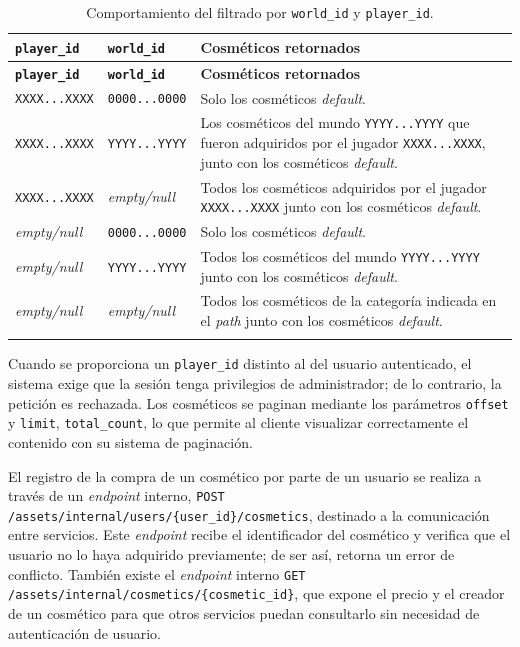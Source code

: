 \renewcommand{\arraystretch}{1.4}
\begin{longtable}{|l|l|p{7cm}|}
\hline
\textbf{\texttt{player\_id}} & \textbf{\texttt{world\_id}} & \textbf{Cosméticos retornados} \\
\hline
\endfirsthead
\hline
\textbf{\texttt{player\_id}} & \textbf{\texttt{world\_id}} & \textbf{Cosméticos retornados} \\
\hline
\endhead
\endfoot

\texttt{XXXX...XXXX} & \texttt{0000...0000} & Solo los cosméticos \textit{default}. \\
\hline
\texttt{XXXX...XXXX} & \texttt{YYYY...YYYY} & Los cosméticos del mundo \texttt{YYYY...YYYY} que fueron adquiridos por el jugador \texttt{XXXX...XXXX}, junto con los cosméticos \textit{default}. \\
\hline
\texttt{XXXX...XXXX} & \textit{empty/null}  & Todos los cosméticos adquiridos por el jugador \texttt{XXXX...XXXX} junto con los cosméticos \textit{default}. \\
\hline
\textit{empty/null}  & \texttt{0000...0000} & Solo los cosméticos \textit{default}. \\
\hline
\textit{empty/null}  & \texttt{YYYY...YYYY} & Todos los cosméticos del mundo \texttt{YYYY...YYYY} junto con los cosméticos \textit{default}. \\
\hline
\textit{empty/null}  & \textit{empty/null}  & Todos los cosméticos de la categoría indicada en el \textit{path} junto con los cosméticos \textit{default}. \\
\hline
\caption{Comportamiento del filtrado por \texttt{world\_id} y \texttt{player\_id}.}\label{tab:cosmetics-filter}
\end{longtable}

Cuando se proporciona un \texttt{player\_id} distinto al del usuario autenticado, el sistema exige que la sesión
tenga privilegios de administrador; de lo contrario, la petición es rechazada. Los cosméticos se paginan mediante
los parámetros \texttt{offset} y \texttt{limit}, \texttt{total\_count}, lo que permite al cliente visualizar correctamente 
el contenido con su sistema de paginación.

\vspace{0.25cm}

El registro de la compra de un cosmético por parte de un usuario se realiza a través de un \textit{endpoint} interno,
\texttt{POST /assets/internal/users/\{user\_id\}/cosmetics}, destinado a la comunicación entre servicios. Este
\textit{endpoint} recibe el identificador del cosmético y verifica que el usuario no lo haya adquirido previamente;
de ser así, retorna un error de conflicto. También existe el \textit{endpoint} interno
\texttt{GET /assets/internal/cosmetics/\{cosmetic\_id\}}, que expone el precio y el creador de un cosmético para
que otros servicios puedan consultarlo sin necesidad de autenticación de usuario.
\vspace{0.25cm}
